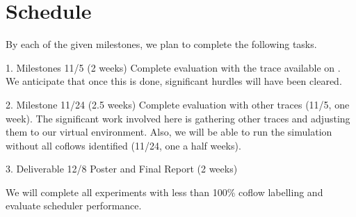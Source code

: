 \documentclass{article}
\begin{document}
\section{Schedule}

By each of the given milestones, we plan to complete the following tasks.

1. Milestones 11/5 (2 weeks)
Complete evaluation with the trace available on \cite{website:coflow-repo}. We anticipate that once this is done, significant hurdles will have been cleared.

2. Milestone 11/24 (2.5 weeks)
Complete evaluation with other traces (11/5, one week). The significant work involved here is gathering other traces and adjusting them to our virtual environment. Also, we will be able to run the simulation without all coflows identified (11/24, one a half weeks). 

3. Deliverable 12/8 Poster and Final Report (2 weeks)

We will complete all experiments with less than 100\% coflow labelling and evaluate scheduler performance.

%
%



\end{document}
